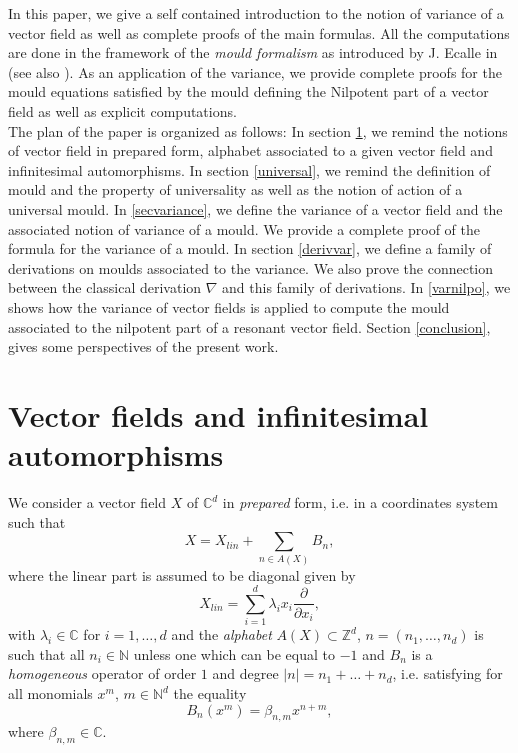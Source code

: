 \documentclass[english,11pt]{amsart}
\def\C{\mathbb{C}}
\def\Z{\mathbb{Z}}
\def\N{\mathbb{N}}
\def\di{\displaystyle}
\begin{document}
In this paper, we give a self contained introduction to the notion of variance of a vector field as well as complete proofs of the main formulas. All the computations are done in the framework of the {\it mould formalism} as introduced by J. Ecalle in \cite{ec2} (see also \cite{cr2}). As an application of the variance, we provide complete proofs for the mould equations satisfied by the mould defining the Nilpotent part of a vector field as well as explicit computations. \\

The plan of the paper is organized as follows: In section \ref{infini}, we remind the notions of vector field in prepared form, alphabet associated to a given vector field and infinitesimal automorphisms. In section \ref{universal}, we remind the definition of mould and the property of universality as well as the notion of action of a universal mould. In \ref{secvariance}, we define the variance of a vector field and the associated notion of variance of a mould. We provide a complete proof of the formula for the variance of a mould. 
In section \ref{derivvar}, we define a family of derivations on moulds associated to the variance. We also prove the connection between the classical derivation $\nabla$ and this family of derivations. In \ref{varnilpo}, we shows how the variance of vector fields is applied to compute the mould associated to the nilpotent part of a resonant vector field. Section \ref{conclusion}, gives some perspectives of the present work.

\section{Vector fields and infinitesimal automorphisms}
\label{infini}

 We consider a vector field $X$ of $\C^d$ in {\it prepared} form, i.e. in a coordinates system such that
 \begin{equation}
     X=X_{lin} +\di\sum_{n\in A(X)} B_n ,
 \end{equation}
where the linear part is assumed to be diagonal given by 
\begin{equation}
    X_{lin} =\di\sum_{i=1}^d \lambda_i x_i \di\frac{\partial}{\partial x_i},
\end{equation}
with $\lambda_i \in \C$ for $i=1,\dots ,d$ and the {\it alphabet} $A(X)\subset \Z^d$, $n=(n_1 ,\dots ,n_d )$ is such that all $n_i \in \N$ unless one which can be equal to $-1$ and $B_n$ is a {\it homogeneous} operator of order $1$ and degree $\mid n \mid =n_1 +\dots +n_d$, i.e. satisfying for all monomials $x^m$, $m\in \N^d$ the equality
\begin{equation}
    B_n (x^m ) =\beta_{n,m} x^{n+m} ,
\end{equation}
where $\beta_{n,m} \in \C$. \\
\end{document}
